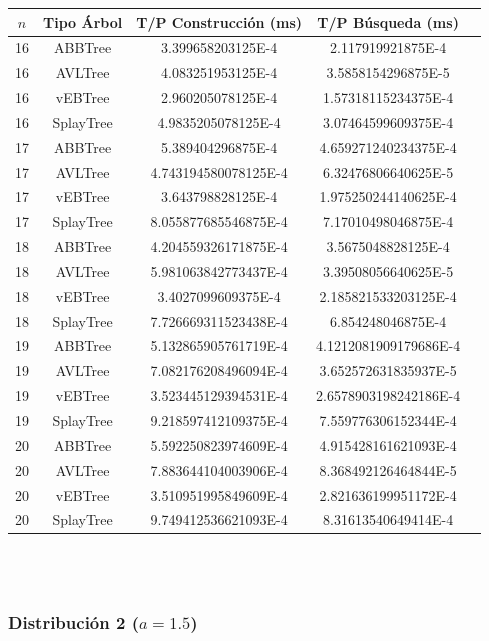 \documentclass[letterpaper,12pt]{article}
\begin{document}
\begin{tabular}{|c|c|c|c|c|}
\hline
\textbf{$n$} & \textbf{Tipo Árbol} & \textbf{T/P Construcción (ms)} & \textbf{T/P Búsqueda (ms)} \\
\hline
16 & ABBTree & 3.399658203125E-4 & 2.117919921875E-4 \\
\hline
16 & AVLTree & 4.083251953125E-4  & 3.5858154296875E-5 \\
\hline
16 & vEBTree & 2.960205078125E-4  & 1.57318115234375E-4 \\
\hline
16 & SplayTree & 4.9835205078125E-4 & 3.07464599609375E-4 \\
\hline
\hline
17 & ABBTree & 5.389404296875E-4  & 4.659271240234375E-4 \\
\hline
17 & AVLTree & 4.743194580078125E-4 & 6.32476806640625E-5 \\
\hline
17 & vEBTree & 3.643798828125E-4  & 1.975250244140625E-4\\
\hline
17 & SplayTree & 8.055877685546875E-4 & 7.17010498046875E-4 \\
\hline
\hline
18 & ABBTree & 4.204559326171875E-4 & 3.5675048828125E-4 \\
\hline
18 & AVLTree & 5.981063842773437E-4 & 3.39508056640625E-5 \\
\hline
18 & vEBTree & 3.4027099609375E-4 & 2.185821533203125E-4 \\
\hline
18 & SplayTree & 7.726669311523438E-4  & 6.854248046875E-4 \\
\hline
\hline
19 & ABBTree & 5.132865905761719E-4 & 4.1212081909179686E-4 \\
\hline
19 & AVLTree & 7.082176208496094E-4  & 3.652572631835937E-5 \\
\hline
19 & vEBTree & 3.523445129394531E-4 & 2.6578903198242186E-4\\
\hline
19 & SplayTree & 9.218597412109375E-4 & 7.559776306152344E-4 \\
\hline
\hline
20 & ABBTree & 5.592250823974609E-4 & 4.915428161621093E-4 \\
\hline
20 & AVLTree & 7.883644104003906E-4 & 8.368492126464844E-5 \\
\hline
20 & vEBTree & 3.510951995849609E-4 & 2.821636199951172E-4\\
\hline
20 & SplayTree & 9.749412536621093E-4 & 8.31613540649414E-4 \\
\hline
\end{tabular}
\\ \\

\subsubsection{Distribución 2 ($a=1.5$)}
\end{document}
